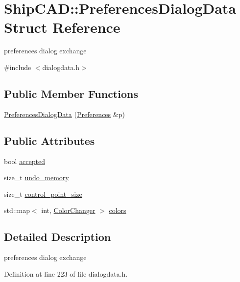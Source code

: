 \hypertarget{structShipCAD_1_1PreferencesDialogData}{}\section{Ship\+C\+AD\+:\+:Preferences\+Dialog\+Data Struct Reference}
\label{structShipCAD_1_1PreferencesDialogData}


preferences dialog exchange  




{\ttfamily \#include $<$dialogdata.\+h$>$}

\subsection*{Public Member Functions}
\begin{DoxyCompactItemize}
\item 
\hyperlink{structShipCAD_1_1PreferencesDialogData_ab08567115eb9f92d24da143ab87db224}{Preferences\+Dialog\+Data} (\hyperlink{classShipCAD_1_1Preferences}{Preferences} \&p)
\end{DoxyCompactItemize}
\subsection*{Public Attributes}
\begin{DoxyCompactItemize}
\item 
bool \hyperlink{structShipCAD_1_1PreferencesDialogData_a273da4c8a491252b81a8135888fd09b7}{accepted}
\item 
size\+\_\+t \hyperlink{structShipCAD_1_1PreferencesDialogData_a221dfa5e704ab65d7ea8552736738da2}{undo\+\_\+memory}
\item 
size\+\_\+t \hyperlink{structShipCAD_1_1PreferencesDialogData_a53ba0a8f8b1cf70ea78d1162703abc6c}{control\+\_\+point\+\_\+size}
\item 
std\+::map$<$ int, \hyperlink{structShipCAD_1_1ColorChanger}{Color\+Changer} $>$ \hyperlink{structShipCAD_1_1PreferencesDialogData_aefc358c8c80389053e1a3b2f333d6da9}{colors}
\end{DoxyCompactItemize}


\subsection{Detailed Description}
preferences dialog exchange 

Definition at line 223 of file dialogdata.\+h.



